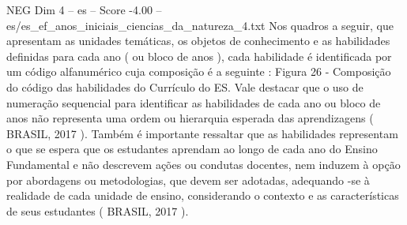 \begin{textsample}{NEG Dim 4 – es – Score -4.00 – es/es\_ef\_anos\_iniciais\_ciencias\_da\_natureza\_4.txt}
Nos quadros a seguir, que apresentam as unidades temáticas, os objetos de conhecimento e as habilidades definidas para cada ano ( ou bloco de anos ), cada habilidade é identificada por um código alfanumérico cuja composição é a seguinte : Figura 26 - Composição do código das habilidades do Currículo do ES.
Vale destacar que o uso de numeração sequencial para identificar as habilidades de cada ano ou bloco de anos não representa uma ordem ou hierarquia esperada das aprendizagens ( BRASIL, 2017 ).
Também é importante ressaltar que as habilidades representam o que se espera que os estudantes aprendam ao longo de cada ano do Ensino Fundamental e não descrevem ações ou condutas docentes, nem induzem à opção por abordagens ou metodologias, que devem ser adotadas, adequando -se à realidade de cada unidade de ensino, considerando o contexto e as características de seus estudantes ( BRASIL, 2017 ).

\end{textsample}
